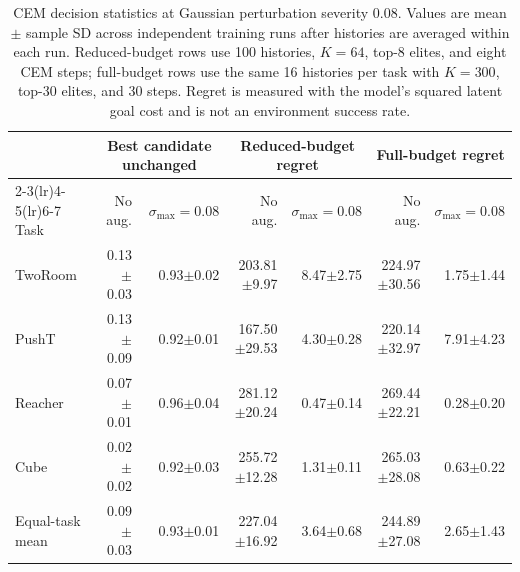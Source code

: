 \begin{table}[H]
\centering
\caption{CEM decision statistics at Gaussian perturbation severity 0.08. Values are mean $\pm$ sample SD across independent training runs after histories are averaged within each run. Reduced-budget rows use 100 histories, $K=64$, top-8 elites, and eight CEM steps; full-budget rows use the same 16 histories per task with $K=300$, top-30 elites, and 30 steps. Regret is measured with the model's squared latent goal cost and is not an environment success rate.}
\label{tab:acpc-planner-absolute}
\scriptsize
\setlength{\tabcolsep}{2.2pt}
\begin{tabular}{lrrrrrr}
\toprule
& \multicolumn{2}{c}{Best candidate unchanged} & \multicolumn{2}{c}{Reduced-budget regret} & \multicolumn{2}{c}{Full-budget regret} \\
\cmidrule(lr){2-3}\cmidrule(lr){4-5}\cmidrule(lr){6-7}
Task & No aug. & $\sigma_{\max}{=}0.08$ & No aug. & $\sigma_{\max}{=}0.08$ & No aug. & $\sigma_{\max}{=}0.08$ \\
\midrule
TwoRoom & 0.13$\pm$0.03 & 0.93$\pm$0.02 & 203.81$\pm$9.97 & 8.47$\pm$2.75 & 224.97$\pm$30.56 & 1.75$\pm$1.44 \\
PushT & 0.13$\pm$0.09 & 0.92$\pm$0.01 & 167.50$\pm$29.53 & 4.30$\pm$0.28 & 220.14$\pm$32.97 & 7.91$\pm$4.23 \\
Reacher & 0.07$\pm$0.01 & 0.96$\pm$0.04 & 281.12$\pm$20.24 & 0.47$\pm$0.14 & 269.44$\pm$22.21 & 0.28$\pm$0.20 \\
Cube & 0.02$\pm$0.02 & 0.92$\pm$0.03 & 255.72$\pm$12.28 & 1.31$\pm$0.11 & 265.03$\pm$28.08 & 0.63$\pm$0.22 \\
\midrule
Equal-task mean & 0.09$\pm$0.03 & 0.93$\pm$0.01 & 227.04$\pm$16.92 & 3.64$\pm$0.68 & 244.89$\pm$27.08 & 2.65$\pm$1.43 \\
\bottomrule
\end{tabular}
\end{table}
